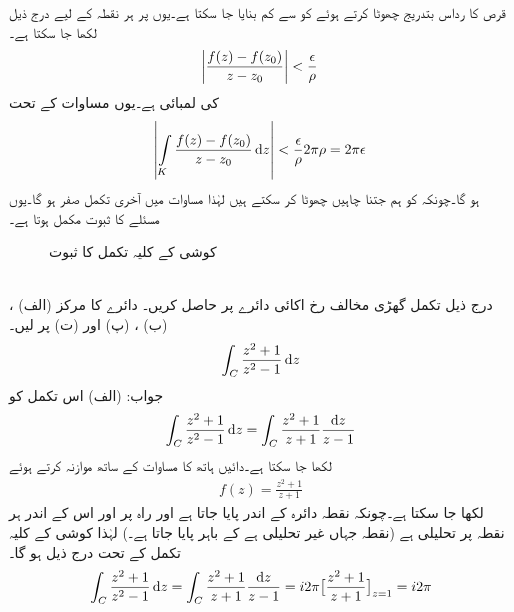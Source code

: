 قرص کا رداس  بتدریج  چھوٹا کرتے ہوئے  کو  سے کم بنایا جا سکتا ہے۔یوں  پر ہر نقطہ کے لیے درج ذیل لکھا جا سکتا ہے۔
\begin{align*}
\abs{\frac{f(z)-f(z_0)}{z-z_0}}<\frac{\epsilon}{\rho}
\end{align*}
 کی لمبائی  ہے۔یوں مساوات  کے تحت 
\begin{align*}
\abs{\int\limits_K \frac{f(z)-f(z_0)}{z-z_0}\dif z}<\frac{\epsilon}{\rho}2\pi\rho=2\pi\epsilon
\end{align*}
ہو گا۔چونکہ  کو ہم جتنا چاہیں چھوٹا کر سکتے ہیں لہٰذا مساوات  میں آخری تکمل صفر ہو گا۔یوں مسئلے کا ثبوت مکمل ہوتا ہے۔
%
\begin{figure}
\centering
{}
\caption{کوشی کے کلیہ تکمل کا ثبوت}
\label{شکل_مخلوط_تکمل_کوشی_کلیہ_ثبوت}
\end{figure}
\quad {}\\
درج ذیل تکمل گھڑی مخالف رخ اکائی دائرے پر حاصل کریں۔ دائرے کا مرکز (الف) ، (ب) ، (پ)  اور (ت)  پر لیں۔
\begin{align*}
\int_C\frac{z^2+1}{z^2-1}\dif z
\end{align*}
جواب:\quad
(الف) \quad  اس تکمل کو
\begin{align*}
\int_C\frac{z^2+1}{z^2-1}\dif z=\int_C \frac{z^2+1}{z+1}\frac{\dif z}{z-1}
\end{align*}
لکھا جا سکتا ہے۔دائیں ہاتھ کا مساوات  کے ساتھ موازنہ کرتے ہوئے
\begin{align*}
f(z)=\frac{z^2+1}{z+1}
\end{align*}
 لکھا جا سکتا ہے۔چونکہ نقطہ  دائرہ  کے اندر پایا جاتا ہے اور  راہ  پر اور اس کے اندر ہر نقطہ پر تحلیلی ہے (نقطہ  جہاں  غیر تحلیلی ہے  کے باہر پایا جاتا ہے۔) لہٰذا کوشی کے کلیہ تکمل کے تحت درج ذیل ہو گا۔
\begin{align*}
\int_C \frac{z^2+1}{z^2-1}\dif z=\int_C \frac{z^2+1}{z+1}\frac{\dif z}{z-1}=i2\pi\big[\frac{z^2+1}{z+1}\big]_{z=1}=i2\pi
\end{align*}

